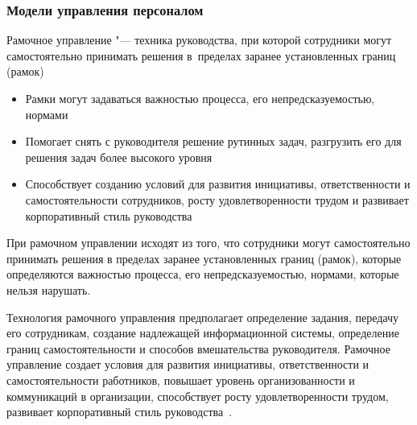 \documentclass{../industrial-development}
\begin{document}
\begin{frame} \frametitle{Модели управления персоналом}
\alert{Рамочное управление} "--- техника руководства, при которой
сотрудники могут самостоятельно принимать решения в~пределах заранее установленных границ (рамок)
    \begin{itemize}
	\item Рамки могут задаваться важностью процесса, его непредсказуемостью, нормами
	\item Помогает снять с руководителя решение рутинных задач, разгрузить его для решения задач более высокого уровня
\item Способствует созданию условий для развития инициативы, ответственности и самостоятельности сотрудников, росту удовлетворенности трудом и развивает корпоративный стиль руководства 
     \end{itemize}
		\end{frame}

\lecturenotes

При рамочном управлении исходят из того, что сотрудники могут самостоятельно принимать решения в пределах заранее установленных границ (рамок), которые определяются важностью процесса, его непредсказуемостью, нормами, которые нельзя нарушать.
 
Технология рамочного управления предполагает определение задания, передачу его сотрудникам, создание надлежащей информационной системы, определение границ самостоятельности и способов вмешательства руководителя. Рамочное управление создает условия для развития инициативы, ответственности и самостоятельности работников, повышает уровень организованности и коммуникаций в организации, способствует росту удовлетворенности трудом, развивает корпоративный стиль руководства~\cite{Porshnev}. 
\end{document}
